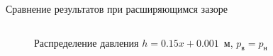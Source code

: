 \documentclass[ignoreonframetext,unicode]{beamer}
\begin{document}
\begin{frame}{Сравнение результатов при расширяющимся зазоре}
\begin{columns}
		
		\begin{figure}[!htbp]
			\caption{Распределение давления $h = 0.15 x + 0.001$~м, $p_{\text{в}} = p_{\text{н}}$}
			\label{zero_pos}
		\end{figure}
	\end{columns}
\end{frame}
\end{document}
